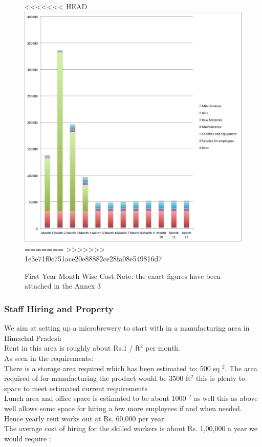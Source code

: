 \documentclass[11pt]{article}
\begin{document}
	\begin{figure}[h!]
	\caption{First Year Month Wise Cost \newline Note: the exact figures have been attached in the Annex 3}
	\centering
<<<<<<< HEAD
	\includegraphics[width=\textwidth]{./month_wise_cost.png}
=======
>>>>>>> 1e3e71f0c751ace20e88882ce28fa08e549816d7
	\end{figure}


      \subsubsection{Staff Hiring and Property}
We aim at setting up a microbrewery to start with in a manufacturing area in Himachal Pradesh \\
Rent in this area is roughly about Rs.1 / ft$^2$ per month. \\
As seen in the requirements: \\
There is a storage area required which has been estimated to: 500 sq $^2$. The area required of for manufacturing the product would be 3500 ft$^2$ this is plenty to space to meet estimated current requirements \\
Lunch area and office space is estimated to be about 1000 $^2$ as well this as above well allows some space for hiring a few more employees if and when needed. \\
Hence yearly rent works out at Rs. 60,000 per year. \\
The average cost of hiring for the skilled workers is about Rs. 1,00,000 a year we would require :
\end{document}
